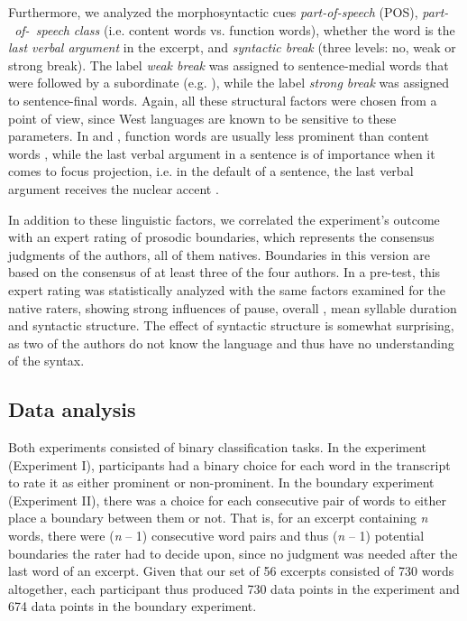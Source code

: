 \documentclass[output=paper
,modfonts
,nonflat]{langsci/langscibook}
\begin{document}
Furthermore, we analyzed the morphosyntactic cues \textit{part-of-speech} (POS), \textit{part-\ of-\ speech} \textit{class} (i.e. content words vs. function words), whether the word is the \textit{last verbal argument} in the excerpt, and \textit{syntactic break} (three levels: no, weak or strong break). The label \textit{weak break} was assigned to sentence-medial words that were followed by a subordinate  (e.g. ), while the label \textit{strong break} was assigned to sentence-final words. Again, all these structural factors were chosen from a  point of view, since West  languages are known to be sensitive to these parameters. In  and , function words are usually less prominent than content words \citep[31]{Büring2012}, while the last verbal argument in a sentence is of importance when it comes to focus projection, i.e. in the default  of a  sentence, the last verbal argument receives the nuclear accent \citep[66]{Uhmann1988}.

In addition to these linguistic factors, we correlated the experiment’s outcome with an expert rating of prosodic boundaries, which represents the consensus judgments of the authors, all of them  natives. Boundaries in this version are based on the consensus of at least three of the four authors. In a pre-test, this expert rating was statistically analyzed with the same factors examined for the native raters, showing strong influences of pause, overall , mean syllable duration and syntactic structure. The effect of syntactic structure is somewhat surprising, as two of the authors do not know the language and thus have no understanding of the syntax. 

\subsection{{{Data analysis}}}

Both experiments consisted of binary classification tasks. In the  experiment (Experiment I), participants had a binary choice for each word in the transcript to rate it as either prominent or non-prominent. In the boundary experiment (Experiment II), there was a choice for each consecutive pair of words to either place a boundary between them or not. That is, for an excerpt containing \textit{n} words, there were (\textit{n} – 1) consecutive word pairs and thus (\textit{n} – 1) potential boundaries the rater had to decide upon, since no judgment was needed after the last word of an excerpt. Given that our set of 56 excerpts consisted of 730 words altogether, each participant thus produced 730 data points in the  experiment and 674 data points in the boundary experiment.
\end{document}

